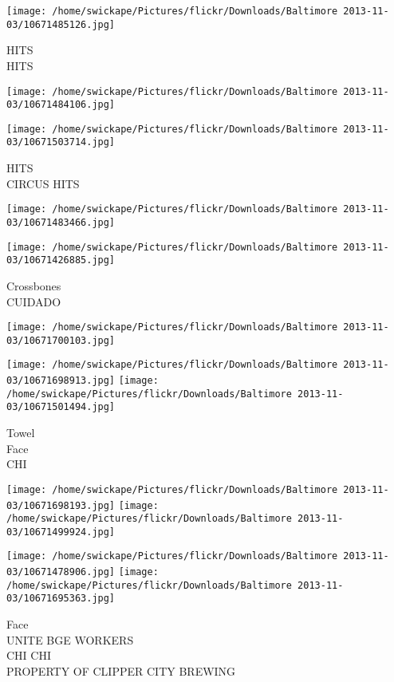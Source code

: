 \documentclass[10pt,letterpaper]{article}
\begin{document}
\vspace{0.25in}
\texttt{[image: /home/swickape/Pictures/flickr/Downloads/Baltimore 2013-11-03/10671485126.jpg]}

HITS\\
HITS
\pagebreak

\texttt{[image: /home/swickape/Pictures/flickr/Downloads/Baltimore 2013-11-03/10671484106.jpg]}

\vspace{0.25in}
\texttt{[image: /home/swickape/Pictures/flickr/Downloads/Baltimore 2013-11-03/10671503714.jpg]}

HITS\\
CIRCUS HITS
\pagebreak

\texttt{[image: /home/swickape/Pictures/flickr/Downloads/Baltimore 2013-11-03/10671483466.jpg]}

\vspace{0.25in}
\texttt{[image: /home/swickape/Pictures/flickr/Downloads/Baltimore 2013-11-03/10671426885.jpg]}

Crossbones\\
CUIDADO
\pagebreak

\texttt{[image: /home/swickape/Pictures/flickr/Downloads/Baltimore 2013-11-03/10671700103.jpg]}

\vspace{0.25in}
\texttt{[image: /home/swickape/Pictures/flickr/Downloads/Baltimore 2013-11-03/10671698913.jpg]}
\texttt{[image: /home/swickape/Pictures/flickr/Downloads/Baltimore 2013-11-03/10671501494.jpg]}

Towel\\
Face\\
CHI
\pagebreak

\texttt{[image: /home/swickape/Pictures/flickr/Downloads/Baltimore 2013-11-03/10671698193.jpg]}
\texttt{[image: /home/swickape/Pictures/flickr/Downloads/Baltimore 2013-11-03/10671499924.jpg]}

\texttt{[image: /home/swickape/Pictures/flickr/Downloads/Baltimore 2013-11-03/10671478906.jpg]}
\texttt{[image: /home/swickape/Pictures/flickr/Downloads/Baltimore 2013-11-03/10671695363.jpg]}

Face\\
UNITE BGE WORKERS\\
CHI CHI\\
PROPERTY OF CLIPPER CITY BREWING
\pagebreak
\end{document}
